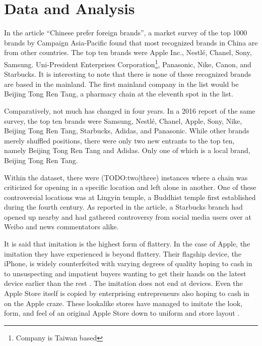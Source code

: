 \chapter{Data and Analysis}

In the article ``Chinese prefer foreign brands'', a market survey of the top
1000 brands by Campaign
Asia-Pacific found that most recognized brands in China are from other
countries. The top ten brands were Apple Inc., Nestlé, Chanel, Sony, Samsung.
Uni-President Enterprises Corporation\footnote{Company is Taiwan based},
Panasonic, Nike, Canon, and Starbucks. It is interesting to note that there is
none of these recognized brands are based in the mainland. The first mainland
company in the list would be Beijing Tong Ren Tang, a pharmacy chain at the
eleventh spot in the list.

Comparatively, not much has changed in four years. In a 2016 report of the
same survey, the top ten brands were Samsung, Nestlé, Chanel, Apple, Sony, Nike,
Beijing Tong Ren Tang, Starbucks, Adidas, and Panasonic. While other brands
merely shuffled positions, there were only two new entrants to the top ten,
namely Beijing Tong Ren Tang and Adidas. Only one of which is a local brand,
Beijing Tong Ren Tang.



Within the dataset, there were (TODO:two|three) instances where a chain was
criticized for opening in a specific location and left alone in another. One of
these controversial locations was at Lingyin temple, a Buddhist temple first
established during the fourth century. As reported in the article, a Starbucks
branch had opened up nearby and had gathered controversy from social media users
over at Weibo and news commentators alike.




It is said that imitation is the highest form of flattery. In the case of Apple,
the imitation they have experienced is beyond flattery. Their flagship device,
the iPhone, is widely counterfeited with varying degrees of quality hoping to
cash in to unsuspecting and impatient buyers wanting to get their hands on the
latest device earlier than the rest \autocite{justice_iphone_2015}. The imitation
does not end at devices. Even the Apple Store itself is copied by enterprising
entrepreneurs also hoping to cash in on the Apple craze. These lookalike stores
have managed to imitate the look, form, and feel of an original Apple Store down
to uniform and store layout \autocite{lee_chinas_2015}.

